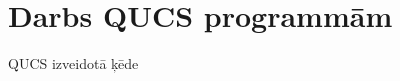 \documentclass{report}
\begin{document}
\begin{figure}

\section{Darbs QUCS programmām}
\caption{QUCS izveidotā ķēde}
\end{figure}
\end{document}
